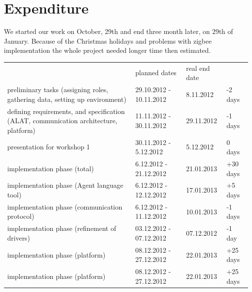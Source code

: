 \documentclass{scrreprt}
\begin{document}
\section{Expenditure}

We started our work on October, 29th and end three month later, on 29th of January.
Because of the Christmas holidays and problems with zigbee implementation 
the whole project needed longer time then estimated.

\vspace{0.2in}
\begin{tabular}{|>{\raggedright}m{5cm}|l|l|l|}
\hline \multicolumn{4}{|c|}{\textbf{Planned and real dates}}\\
\hline
			&  planned dates			& real end date		& 		\\\hline
preliminary tasks (assigning roles, gathering data, setting up environment)
&  29.10.2012 - 10.11.2012		& 8.11.2012	 	& -2 days	\\\hline

defining requirements, and specification (ALAT, communication architecture, platform)
&  11.11.2012 - 30.11.2012		& 29.11.2012	 	& -1 days	\\\hline

presentation for workshop 1
&  30.11.2012 - 5.12.2012				& 5.12.2012	 	& 0 days	\\\hline

implementation phase (total)
&  6.12.2012 - 21.12.2012			& 21.01.2013	 	& +30 days	\\\hline

implementation phase (Agent language tool)
&  6.12.2012 - 12.12.2012			& 17.01.2013	 	& +5 days	\\\hline

implementation phase (communication protocol)
&  6.12.2012 - 11.12.2012			& 10.01.2013	 	& -1 days	\\\hline

implementation phase (refinement of drivers)
&  03.12.2012 - 07.12.2012			& 07.12.2012	 	& -1 day	\\\hline

implementation phase (platform)
&  08.12.2012 - 27.12.2012			& 22.01.2013	 	& +25 days	\\\hline

implementation phase (platform)
&  08.12.2012 - 27.12.2012			& 22.01.2013	 	& +25 days	\\\hline

\hline
\end{tabular}
\end{document}
